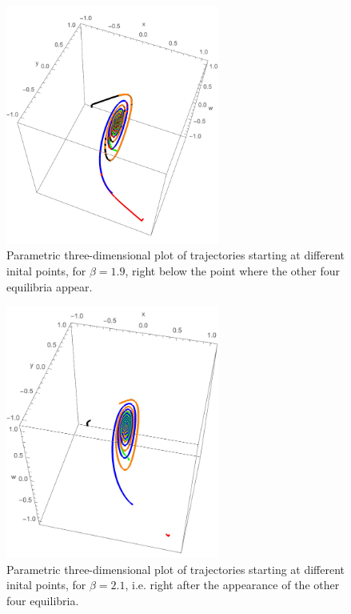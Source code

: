 \documentclass[a4paper,10pt,leqno]{amsart}
\theoremstyle{plain}
\begin{document}
\begin{figure}   
\centering   
\includegraphics[width=7cm]{3D_sim_b=2.pdf}   
\caption{Parametric three-dimensional plot of trajectories starting at different inital points, for $\beta = 1.9$, right below the point where the other four equilibria appear.}   
\label{3D_pic}   
\end{figure}   


\begin{figure}   
\centering   
\includegraphics[width=7cm]{3D_sim_b=2_1.pdf}   
\caption{Parametric three-dimensional plot of trajectories starting at different inital points, for $\beta = 2.1$, i.e. right after the appearance of the other four equilibria.}   
\label{3D_pic1}   
\end{figure}   
\end{document}
